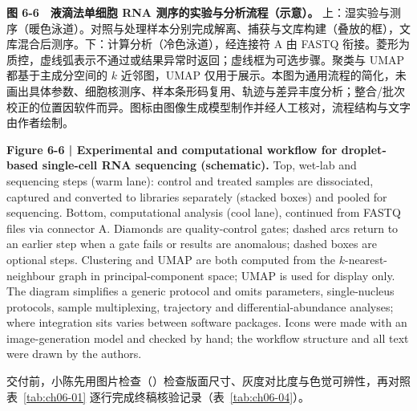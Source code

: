 \begin{BookNote}
\textbf{图 6-6　液滴法单细胞 RNA 测序的实验与分析流程（示意）。} 上：湿实验与测序（暖色泳道）。对照与处理样本分别完成解离、捕获与文库构建（叠放的框），文库混合后测序。下：计算分析（冷色泳道），经连接符 A 由 FASTQ 衔接。菱形为质控，虚线弧表示不通过或结果异常时返回；虚线框为可选步骤。聚类与 UMAP 都基于主成分空间的 $k$ 近邻图，UMAP 仅用于展示。本图为通用流程的简化，未画出具体参数、细胞核测序、样本条形码复用、轨迹与差异丰度分析；整合/批次校正的位置因软件而异。图标由图像生成模型制作并经人工核对，流程结构与文字由作者绘制。

\medskip
\textbf{Figure 6-6 | Experimental and computational workflow for droplet-based single-cell RNA sequencing (schematic).} Top, wet-lab and sequencing steps (warm lane): control and treated samples are dissociated, captured and converted to libraries separately (stacked boxes) and pooled for sequencing. Bottom, computational analysis (cool lane), continued from FASTQ files via connector A. Diamonds are quality-control gates; dashed arcs return to an earlier step when a gate fails or results are anomalous; dashed boxes are optional steps. Clustering and UMAP are both computed from the $k$-nearest-neighbour graph in principal-component space; UMAP is used for display only. The diagram simplifies a generic protocol and omits parameters, single-nucleus protocols, sample multiplexing, trajectory and differential-abundance analyses; where integration sits varies between software packages. Icons were made with an image-generation model and checked by hand; the workflow structure and all text were drawn by the authors.
\end{BookNote}

交付前，小陈先用图片检查（）检查版面尺寸、灰度对比度与色觉可辨性，再对照表~\ref{tab:ch06-01} 逐行完成终稿核验记录（表~\ref{tab:ch06-04}）。

